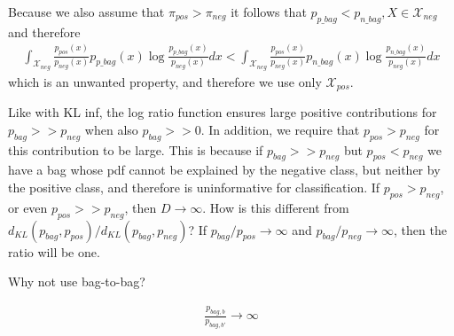 %


Because we also assume that $\pi_{pos} > \pi_{neg}$ it follows that $p_{p \_ bag} < p_{n \_ bag}, X \in \mathcal{X}_{neg}$ and therefore 
\begin{align}
  \int_{\mathcal{X}_{neg}} \frac{p_{pos}(x)}{p_{neg}(x)} p_{p\_bag}(x) \log \frac{p_{p\_bag}(x)}{p_{neg}(x)} dx < \int_{\mathcal{X}_{neg}} \frac{p_{pos}(x)}{p_{neg}(x)} p_{n \_ bag}(x) \log \frac{p_{n \_bag}(x)}{p_{neg}(x)} dx
\end{align}
which is an unwanted property, and therefore we use only $\mathcal{X}_{pos}$.

Like with KL inf, the log ratio function ensures large positive contributions for $p_{bag} >> p_{neg}$ when also $p_{bag} >> 0$. 
In addition, we require that $p_{pos} > p_{neg}$ for this contribution to be large. 
This is because if $p_{bag} >> p_{neg}$ but $p_{pos} < p_{neg}$ we have a bag whose pdf cannot be explained by the negative class, but neither by the positive class, and therefore is uninformative for classification. 
If $p_{pos} > p_{neg}$, or even $p_{pos} >> p_{neg}$, then $D \rightarrow \infty$.
How is this different from $d_{KL}(p_{bag},p_{pos})/d_{KL}(p_{bag},p_{neg})$?
If $p_{bag}/p_{pos} \rightarrow \infty$ and $p_{bag}/p_{neg} \rightarrow \infty$, then the ratio will be one. 

Why not use bag-to-bag?

\begin{align}
  \frac{p_{bag,b}}{p_{bag,b'}} \rightarrow \infty
\end{align}


